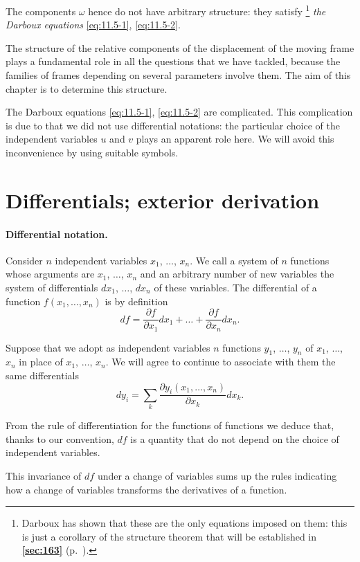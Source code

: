 \documentclass[leqno,11pt]{book}
\numberwithin{equation}{chapter}
\newcommand{\pd}{\partial}
\theoremstyle{shape1}
\theoremstyle{shapesmall}
\newcommand{\fsref}[1]{{\rm\textsection\textbf{\ref{sec:#1}}}}
\begin{document}
The components $\omega$ hence do not have arbitrary structure: they satisfy \footnote{Darboux has shown that these are the only equations imposed on them: this is just a corollary of the structure theorem that will be established in \fsref{163} (p.~\pageref{sec:163}).} \emph{the Darboux equations} \eqref{eq:11.5-1}, \eqref{eq:11.5-2}.

The structure of the relative components of the displacement of the moving frame plays a fundamental role in all the questions that we have tackled, because the families of frames depending on several parameters involve them. The aim of this chapter is to determine this structure.

The Darboux equations \eqref{eq:11.5-1}, \eqref{eq:11.5-2} are complicated. This complication is due to that we did not use differential notations: the particular choice of the independent variables $u$ and $v$ plays an apparent role here. We will avoid this inconvenience by using suitable symbols.

\section{Differentials; exterior derivation}
\label{sec:diff-exter-deriv}

\paragraph{Differential notation.}
\label{sec:153}
Consider $n$ independent variables $x_{1}$, $\dots$, $x_{n}$. We call a system of $n$ functions whose arguments are $x_{1}$, $\dots$, $x_{n}$ and an arbitrary number of new variables the system of differentials $dx_{1}$, $\dots$, $dx_{n}$ of these variables. The differential of a function $f(x_{1}, \dots,x_{n})$ is by definition
\[
df=\frac{\pd f}{\pd x_{1}}dx_{1}+\dots+\frac{\pd f}{\pd x_{n}}dx_{n}.
\]

Suppose that we adopt as independent variables $n$ functions $y_{1}$, $\dots$, $y_{n}$ of $x_{1}$, $\dots$, $x_{n}$ in place of $x_{1}$, $\dots$, $x_{n}$. We will agree to continue to associate with them the same differentials
\[
dy_{i}=\sum_{k}\frac{\pd y_{i}(x_{1},\dots,x_{n})}{\pd x_{k}}dx_{k}.
\]

From the rule of differentiation for the functions of functions we deduce that, thanks to our convention, $df$ is a quantity that do not depend on the choice of independent variables.

This invariance of $df$ under a change of variables sums up the rules indicating how a change of variables transforms the derivatives of a function.
\end{document}
